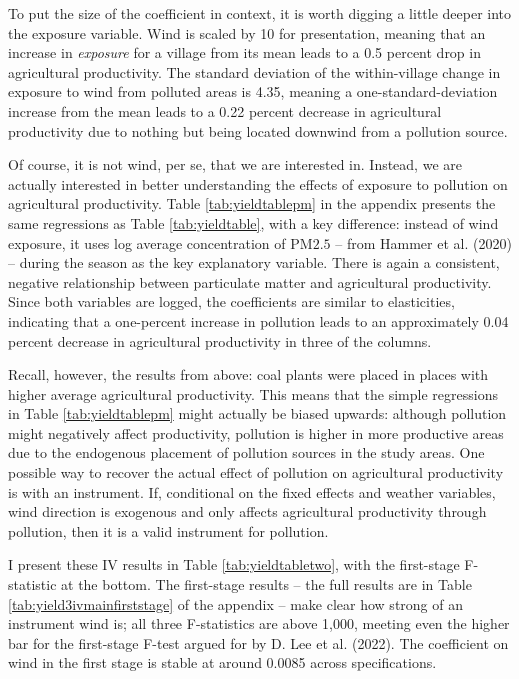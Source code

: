 \documentclass[
]{article}
\begin{document}
To put the size of the coefficient in context, it is worth digging a little deeper into the exposure variable. Wind is scaled by 10 for presentation, meaning that an increase in \emph{exposure} for a village from its mean leads to a 0.5 percent drop in agricultural productivity. The standard deviation of the within-village change in exposure to wind from polluted areas is 4.35, meaning a one-standard-deviation increase from the mean leads to a 0.22 percent decrease in agricultural productivity due to nothing but being located downwind from a pollution source.

Of course, it is not wind, per se, that we are interested in. Instead, we are actually interested in better understanding the effects of exposure to pollution on agricultural productivity. Table \ref{tab:yieldtablepm} in the appendix presents the same regressions as Table \ref{tab:yieldtable}, with a key difference: instead of wind exposure, it uses log average concentration of \(\mathrm{PM 2.5}\) -- from Hammer et al. (2020) -- during the season as the key explanatory variable. There is again a consistent, negative relationship between particulate matter and agricultural productivity. Since both variables are logged, the coefficients are similar to elasticities, indicating that a one-percent increase in pollution leads to an approximately 0.04 percent decrease in agricultural productivity in three of the columns.

Recall, however, the results from above: coal plants were placed in places with higher average agricultural productivity. This means that the simple regressions in Table \ref{tab:yieldtablepm} might actually be biased upwards: although pollution might negatively affect productivity, pollution is higher in more productive areas due to the endogenous placement of pollution sources in the study areas. One possible way to recover the actual effect of pollution on agricultural productivity is with an instrument. If, conditional on the fixed effects and weather variables, wind direction is exogenous and only affects agricultural productivity through pollution, then it is a valid instrument for pollution.

I present these IV results in Table \ref{tab:yieldtabletwo}, with the first-stage F-statistic at the bottom. The first-stage results -- the full results are in Table \ref{tab:yield3ivmainfirststage} of the appendix -- make clear how strong of an instrument wind is; all three F-statistics are above 1,000, meeting even the higher bar for the first-stage F-test argued for by D. Lee et al. (2022). The coefficient on wind in the first stage is stable at around 0.0085 across specifications.
\end{document}
